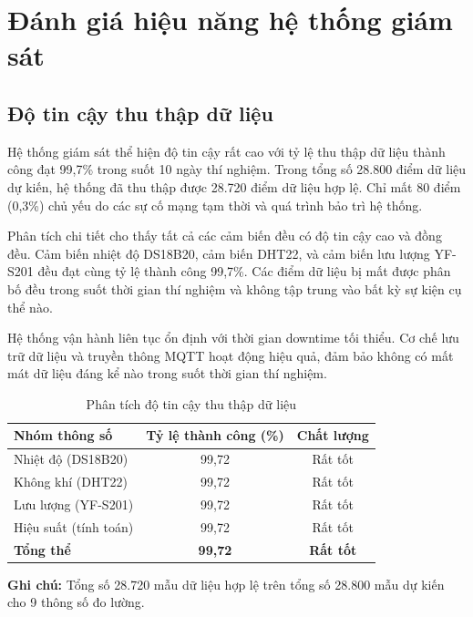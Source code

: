 \documentclass[../main.tex]{subfiles}
\begin{document}
\section{Đánh giá hiệu năng hệ thống giám sát}
\label{sec:monitoring_system_performance}

\subsection{Độ tin cậy thu thập dữ liệu}
\label{sec:data_reliability}

Hệ thống giám sát thể hiện độ tin cậy rất cao với tỷ lệ thu thập dữ liệu thành công đạt 99,7\% trong suốt 10 ngày thí nghiệm. Trong tổng số 28.800 điểm dữ liệu dự kiến, hệ thống đã thu thập được 28.720 điểm dữ liệu hợp lệ. Chỉ mất 80 điểm (0,3\%) chủ yếu do các sự cố mạng tạm thời và quá trình bảo trì hệ thống.

Phân tích chi tiết cho thấy tất cả các cảm biến đều có độ tin cậy cao và đồng đều. Cảm biến nhiệt độ DS18B20, cảm biến DHT22, và cảm biến lưu lượng YF-S201 đều đạt cùng tỷ lệ thành công 99,7\%. Các điểm dữ liệu bị mất được phân bố đều trong suốt thời gian thí nghiệm và không tập trung vào bất kỳ sự kiện cụ thể nào.

Hệ thống vận hành liên tục ổn định với thời gian downtime tối thiểu. Cơ chế lưu trữ dữ liệu và truyền thông MQTT hoạt động hiệu quả, đảm bảo không có mất mát dữ liệu đáng kể nào trong suốt thời gian thí nghiệm.

\begin{table}[H]
\centering
\renewcommand{\arraystretch}{1.2}
\caption{Phân tích độ tin cậy thu thập dữ liệu}
\label{tab:sensor_reliability_analysis}
\begin{tabular}{|l|c|c|}
\hline
\textbf{Nhóm thông số} & \textbf{Tỷ lệ thành công (\%)} & \textbf{Chất lượng} \\
\hline
Nhiệt độ (DS18B20) & 99,72 & Rất tốt \\
\hline
Không khí (DHT22) & 99,72 & Rất tốt \\
\hline
Lưu lượng (YF-S201) & 99,72 & Rất tốt \\
\hline
Hiệu suất (tính toán) & 99,72 & Rất tốt \\
\hline
\textbf{Tổng thể} & \textbf{99,72} & \textbf{Rất tốt} \\
\hline
\end{tabular}
\end{table}

\textbf{Ghi chú:} Tổng số 28.720 mẫu dữ liệu hợp lệ trên tổng số 28.800 mẫu dự kiến cho 9 thông số đo lường.
\end{document}
